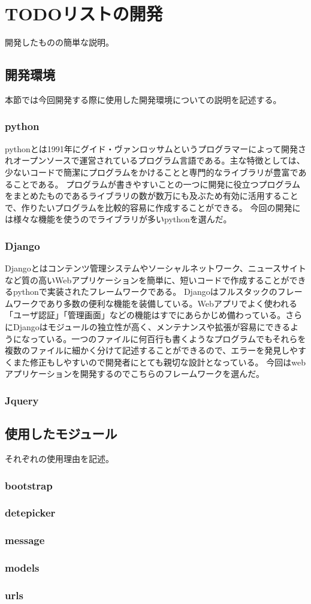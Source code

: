 \chapter{TODOリストの開発}
\label{cha:Development}
開発したものの簡単な説明。

\section{開発環境}
本節では今回開発する際に使用した開発環境についての説明を記述する。
\subsection{python}
pythonとは1991年にグイド・ヴァンロッサムというプログラマーによって開発されオープンソースで運営されているプログラム言語である。主な特徴としては、少ないコードで簡潔にプログラムをかけることと専門的なライブラリが豊富であることである。
プログラムが書きやすいことの一つに開発に役立つプログラムをまとめたものであるライブラリの数が数万にも及ぶため有効に活用することで、作りたいプログラムを比較的容易に作成することができる。
今回の開発には様々な機能を使うのでライブラリが多いpythonを選んだ。
\subsection{Django}
Djangoとはコンテンツ管理システムやソーシャルネットワーク、ニュースサイトなど質の高いWebアプリケーションを簡単に、短いコードで作成することができるpythonで実装されたフレームワークである。
Djangoはフルスタックのフレームワークであり多数の便利な機能を装備している。Webアプリでよく使われる「ユーザ認証」「管理画面」などの機能はすでにあらかじめ備わっている。さらにDjangoはモジュールの独立性が高く、メンテナンスや拡張が容易にできるようになっている。一つのファイルに何百行も書くようなプログラムでもそれらを複数のファイルに細かく分けて記述することができるので、エラーを発見しやすくまた修正もしやすいので開発者にとても親切な設計となっている。
今回はwebアプリケーションを開発するのでこちらのフレームワークを選んだ。
\subsection{Jquery}

\section{使用したモジュール}
それぞれの使用理由を記述。
\subsection{bootstrap}

\subsection{detepicker}

\subsection{message}

\subsection{models}

\subsection{urls}
